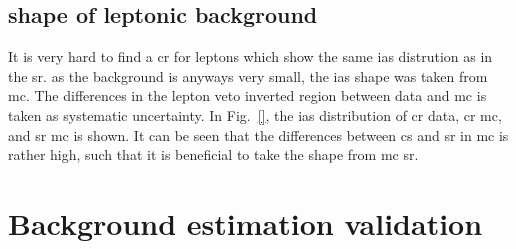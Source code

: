 \renewcommand{\arraystretch}{1.4}
\begin{table}[!h]
\centering
\caption{Scaling factor, number of events in the CR in data and the resulting inclusive estimation}
\label{tab:LeptonicResults}
\vspace{10pt}
\end{table}



\subsection*{\ias shape of leptonic background}
It is very hard to find a cr for leptons which show the same ias distrution as in the sr.
as the background is anyways very small, the ias shape was taken from mc.
The differences in the lepton veto inverted region between data and mc is taken as systematic uncertainty.
In Fig.~\ref{}, the ias distribution of cr data, cr mc, and sr mc is shown.
It can be seen that the differences between cs and sr in mc is rather high, such that it is beneficial to take the \ias shape from mc sr.
\section{Background estimation validation}
\label{sec:BkgValidation}


